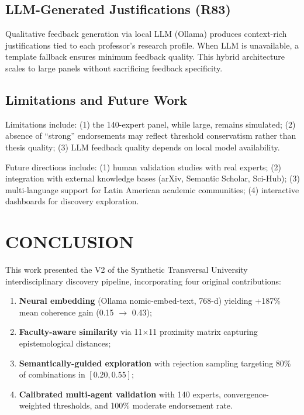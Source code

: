 \documentclass[a4paper,12pt]{article}
\begin{document}
\subsection{LLM-Generated Justifications (R83)}

Qualitative feedback generation via local LLM (Ollama) produces context-rich 
justifications tied to each professor's research profile. When LLM is unavailable, 
a template fallback ensures minimum feedback quality. This hybrid architecture 
scales to large panels without sacrificing feedback specificity.

\subsection{Limitations and Future Work}

Limitations include: (1) the 140-expert panel, while large, remains simulated; 
(2) absence of ``strong'' endorsements may reflect threshold conservatism rather 
than thesis quality; (3) LLM feedback quality depends on local model availability. 

Future directions include: (1) human validation studies with real experts; 
(2) integration with external knowledge bases (arXiv, Semantic Scholar, Sci-Hub); 
(3) multi-language support for Latin American academic communities; 
(4) interactive dashboards for discovery exploration.


\section{CONCLUSION}\label{sec:conclusion}

This work presented the V2 of the Synthetic Transversal University interdisciplinary 
discovery pipeline, incorporating four original contributions:

\begin{enumerate}
    \item \textbf{Neural embedding} (Ollama nomic-embed-text, 768-d) yielding +187\% 
          mean coherence gain (0.15 $\to$ 0.43);
    \item \textbf{Faculty-aware similarity} via 11$\times$11 proximity matrix capturing 
          epistemological distances;
    \item \textbf{Semantically-guided exploration} with rejection sampling targeting 
          80\% of combinations in $[0.20, 0.55]$;
    \item \textbf{Calibrated multi-agent validation} with 140 experts, convergence-weighted 
          thresholds, and 100\% moderate endorsement rate.
\end{enumerate}
\end{document}

